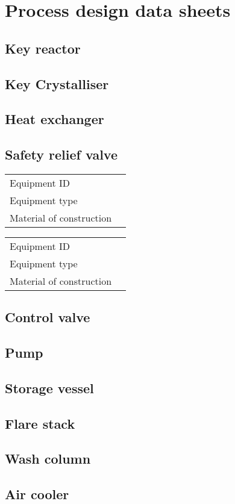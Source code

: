 \section{Process design data sheets}

\subsection{Key reactor}

\subsection{Key Crystalliser}

\subsection{Heat exchanger}

\subsection{Safety relief valve}

\begin{table}[H]
    \centering
    \begin{tabular}{@{}l|l@{}}
    \toprule
       Equipment ID  &  \\
       Equipment type  &  \\
       Material of construction & \\
       \bottomrule
    \end{tabular}
\end{table}

\begin{table}[H]
    \centering
    \begin{tabular}{@{}l|l@{}}
    \toprule
       Equipment ID  &  \\
       Equipment type  &  \\
       Material of construction & \\
       \bottomrule
    \end{tabular}
\end{table}

\subsection{Control valve}

\subsection{Pump}

\subsection{Storage vessel}

\subsection{Flare stack}

\subsection{Wash column}

\subsection{Air cooler}


